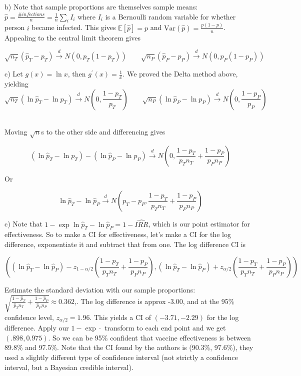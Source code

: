 \documentclass[12pt]{article}
\newcommand{\E}{\mathbb{E}}
\begin{document}
\begin{enumerate}[1.]
b) Note that sample proportions are themselves sample means: $\hat{p} = \frac{\# infections}{n} = \frac{1}{n}\sum_{i} I_{i}$ where $I_{i}$ is a Bernoulli random variable for whether person $i$ became infected. This gives $\E[\hat{p}] = p$ and $\mathrm{Var}(\hat{p}) = \frac{p(1-p)}{n}$. Appealing to the central limit theorem gives 

\[ \sqrt{n_{T}} (\hat{p}_{T} - p_{T}) \overset{d}{\to} N(0, p_{T}(1-p_{T})) \qquad \sqrt{n_{P}} (\hat{p}_{P} - p_{P}) \overset{d}{\to} N(0, p_{P}(1-p_{P}))\]
\medskip

c) Let $g(x) = \ln x$, then $g^{\prime}(x) = \frac{1}{x}$. We proved the Delta method above, yielding
\[ \sqrt{n_{T}} (\ln\hat{p}_{T} - \ln p_{T}) \overset{d}{\to} N(0, \frac{1-p_{T}}{p_{T}}) \qquad \sqrt{n_{P}} (\ln \hat{p}_{P} - \ln p_{P}) \overset{d}{\to} N(0, \frac{1-p_{P}}{p_{P}})\]\

Moving $\sqrt{n}$s to the other side and differencing gives

\[(\ln\hat{p}_{T} - \ln p_{T}) - (\ln\hat{p}_{P} - \ln p_{P}) \overset{d}{\to}N(0,  \frac{1-p_{T}}{p_{T}n_{T}} + \frac{1-p_{P}}{p_{P}n_{P}})\]

Or 


\[\ln\hat{p}_{T}  - \ln\hat{p}_{P}  \overset{d}{\to}N(p_{T} - p_{P},  \frac{1-p_{T}}{p_{T}n_{T}} + \frac{1-p_{P}}{p_{P}n_{P}})\]
\medskip

c) Note that $1 - \exp{\ln\hat{p}_{T}  - \ln\hat{p}_{P}} = 1 - \widehat{IRR}$, which is our point estimator for effectiveness. So to make a CI for effectiveness, let's make a CI for the log difference, exponentiate it and subtract that from one. The log difference CI is 

\[\left((\ln\hat{p}_{T}  - \ln\hat{p}_{P}) - z_{1-\alpha/2} \left(\frac{1-p_{T}}{p_{T}n_{T}} + \frac{1-p_{P}}{p_{P}n_{P}}\right), (\ln\hat{p}_{T}  - \ln\hat{p}_{P}) + z_{\alpha/2} \left(\frac{1-p_{T}}{p_{T}n_{T}} + \frac{1-p_{P}}{p_{P}n_{P}}\right) \right)\]

Estimate the standard deviation with our sample proportions: $\sqrt{\frac{1-\hat{p}_{T}}{\hat{p}_{T}n_{T}} + \frac{1-\hat{p}_{P}}{\hat{p}_{P}n_{P}}} \approx 0.362$,. The log difference is approx -3.00, and at the 95\% confidence level, $z_{\alpha/2}=1.96$. This yields a CI of $(-3.71, -2.29)$ for the log difference. Apply our $1 - \exp{\cdot}$ transform to each end point and we get $(.898, 0.975)$. So we can be 95\% confident that vaccine effectiveness is between 89.8\% and 97.5\%. Note that the CI found by the authors is (90.3\%, 97.6\%), they used a slightly different type of confidence interval (not strictly a confidence interval, but a Bayesian credible interval). 
\fi


\end{enumerate}
\end{document}
